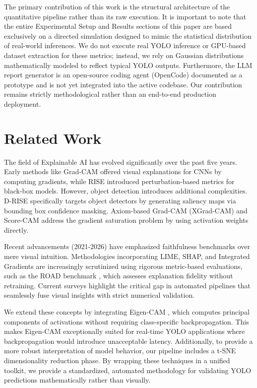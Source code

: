 \documentclass[conference]{IEEEtran}
\begin{document}
The primary contribution of this work is the structural architecture of the quantitative pipeline rather than its raw execution. It is important to note that the entire Experimental Setup and Results sections of this paper are based exclusively on a directed simulation designed to mimic the statistical distribution of real-world inferences. We do not execute real YOLO inference or GPU-based dataset extraction for these metrics; instead, we rely on Gaussian distributions mathematically modeled to reflect typical YOLO outputs. Furthermore, the LLM report generator is an open-source coding agent (OpenCode) documented as a prototype and is not yet integrated into the active codebase. Our contribution remains strictly methodological rather than an end-to-end production deployment.

\section{Related Work}
The field of Explainable AI has evolved significantly over the past five years. Early methods like Grad-CAM \cite{selvaraju2017grad} offered visual explanations for CNNs by computing gradients, while RISE \cite{petsiuk2018rise} introduced perturbation-based metrics for black-box models. However, object detection introduces additional complexities. D-RISE \cite{petsiuk2021drise} specifically targets object detectors by generating saliency maps via bounding box confidence masking. Axiom-based Grad-CAM (XGrad-CAM) \cite{fu2020xgrad} and Score-CAM \cite{wang2020score} address the gradient saturation problem by using activation weights directly. 

Recent advancements (2021-2026) have emphasized faithfulness benchmarks over mere visual intuition. Methodologies incorporating LIME, SHAP, and Integrated Gradients are increasingly scrutinized using rigorous metric-based evaluations, such as the ROAD benchmark \cite{rong2022road}, which assesses explanation fidelity without retraining. Current surveys \cite{arya2020aix360} highlight the critical gap in automated pipelines that seamlessly fuse visual insights with strict numerical validation.

We extend these concepts by integrating Eigen-CAM \cite{muhammad2020eigencam}, which computes principal components of activations without requiring class-specific backpropagation. This makes Eigen-CAM exceptionally suited for real-time YOLO applications where backpropagation would introduce unacceptable latency. Additionally, to provide a more robust interpretation of model behavior, our pipeline includes a t-SNE \cite{vandermaaten2008tsne} dimensionality reduction phase. By wrapping these techniques in a unified toolkit, we provide a standardized, automated methodology for validating YOLO predictions mathematically rather than visually.
\end{document}
